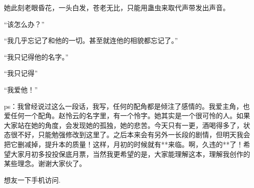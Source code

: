 \begin{this_body}
她此刻老眼昏花，一头白发，苍老无比，只能用蛊虫来取代声带发出声音。

“该怎么办？”

“我几乎忘记了和他的一切。甚至就连他的相貌都忘记了。”

“我只记得他的名字。”

“我只记得”

“我爱他！”

ps：我曾经说过这么一段话，我写，任何的配角都是倾注了感情的。我爱主角，也爱任何一个配角。赵怜云的名字里，有一个怜字。她其实是一个很可怜的人。如果大家站在她的角度，会发现她的孤独，她的悲苦。今天只有一更，酒喝得多了，状态很不好，只能勉强修改到这里了。之后本来会有另外一长段的剧情，但明天我会把它删减掉，提升本的质量！这样，月初的时候就有**来临。啊，久违的**了！希望大家月初多投投保底月票，当然我更希望的是，大家能理解这本，理解我创作的某些理念。谢谢大家伙了。

想友一下手机访问.

\end{this_body}

